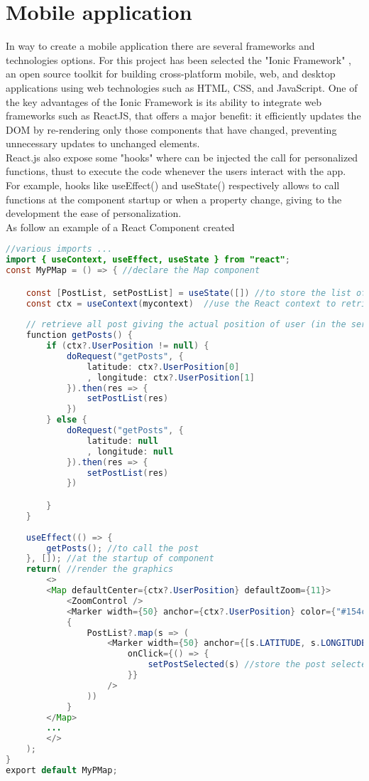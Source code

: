\documentclass[conference]{IEEEtran}
\begin{document}
\section{Mobile application}
In way to create a mobile application there are several frameworks and technologies options. For this project has been selected the "Ionic Framework" \cite{b1}, an open source toolkit for building cross-platform mobile, web, and desktop applications using web technologies such as HTML, CSS, and JavaScript.
One of the key advantages of the Ionic Framework is its ability to integrate  web frameworks such as ReactJS, that offers a major benefit: it efficiently updates the DOM by re-rendering only those components that have changed, preventing unnecessary updates to unchanged elements.\\
React.js also expose some "hooks" where can be injected the call for personalized functions, thust to execute the code whenever the users interact with the app.
For example, hooks like useEffect() and useState() respectively allows to call functions at the component startup or when a property change, giving to the development the ease of personalization.
\\
As follow an example of a React Component created
\begin{lstlisting}[language=Java, caption=Map component snippet]
//various imports ...
import { useContext, useEffect, useState } from "react";
const MyPMap = () => { //declare the Map component

    const [PostList, setPostList] = useState([]) //to store the list of posts
    const ctx = useContext(mycontext)  //use the React context to retrieve data of other components
    
    // retrieve all post giving the actual position of user (in the server it will be computed the nearest posts)
    function getPosts() {
        if (ctx?.UserPosition != null) {
            doRequest("getPosts", {
                latitude: ctx?.UserPosition[0]
                , longitude: ctx?.UserPosition[1]
            }).then(res => {
                setPostList(res)
            })
        } else {
            doRequest("getPosts", {
                latitude: null
                , longitude: null
            }).then(res => {
                setPostList(res)
            })

        }
    }
    
    useEffect(() => {
        getPosts(); //to call the post
    }, []); //at the startup of component
    return( //render the graphics
        <>
        <Map defaultCenter={ctx?.UserPosition} defaultZoom={11}>
            <ZoomControl />
            <Marker width={50} anchor={ctx?.UserPosition} color={"#154c79"} />
            {
                PostList?.map(s => (
                    <Marker width={50} anchor={[s.LATITUDE, s.LONGITUDE]} color={(s?.MEDIATYPE?.length > 0) ? '#d6c531' : '#f23c3c'}
                        onClick={() => {
                            setPostSelected(s) //store the post selected to open it in the opportuned component (viewPost)
                        }}
                    />
                ))
            }
        </Map>
        ...
        </>
    );
}
export default MyPMap;
\end{lstlisting}
\end{document}
